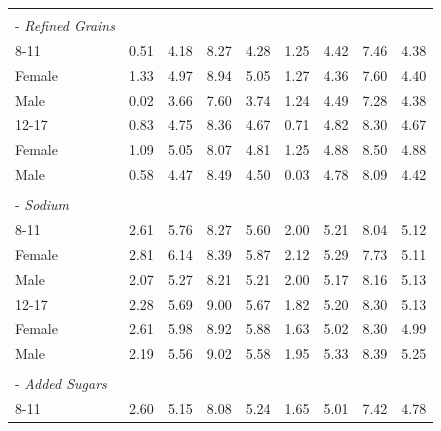 \documentclass[12pt,leqno,titlepage]{amsart}
\newcommand{\1}{\mathbbm{1}}
\begin{document}
\begin{bibunit}
\begin{longtable}{@{\extracolsep{\fill}}lcccc|cccc@{}}
\rule{0pt}{0.35em} & & & & & & & & \\
\hspace*{0.8em}- \textit{Refined Grains} & & & & & & & & \\
\hspace*{2.2em}8-11 & 0.51 & 4.18 & 8.27 & 4.28 & 1.25 & 4.42 & 7.46 & 4.38 \\
\hspace*{4.4em}Female & 1.33 & 4.97 & 8.94 & 5.05 & 1.27 & 4.36 & 7.60 & 4.40 \\
\hspace*{4.4em}Male & 0.02 & 3.66 & 7.60 & 3.74 & 1.24 & 4.49 & 7.28 & 4.38 \\
\hspace*{2.2em}12-17 & 0.83 & 4.75 & 8.36 & 4.67 & 0.71 & 4.82 & 8.30 & 4.67 \\
\hspace*{4.4em}Female & 1.09 & 5.05 & 8.07 & 4.81 & 1.25 & 4.88 & 8.50 & 4.88 \\
\hspace*{4.4em}Male & 0.58 & 4.47 & 8.49 & 4.50 & 0.03 & 4.78 & 8.09 & 4.42 \\
\rule{0pt}{1.1em} & & & & & & & & \\
\hspace*{0.8em}- \textit{Sodium} & & & & & & & & \\
\hspace*{2.2em}8-11 & 2.61 & 5.76 & 8.27 & 5.60 & 2.00 & 5.21 & 8.04 & 5.12 \\
\hspace*{4.4em}Female & 2.81 & 6.14 & 8.39 & 5.87 & 2.12 & 5.29 & 7.73 & 5.11 \\
\hspace*{4.4em}Male & 2.07 & 5.27 & 8.21 & 5.21 & 2.00 & 5.17 & 8.16 & 5.13 \\
\hspace*{2.2em}12-17 & 2.28 & 5.69 & 9.00 & 5.67 & 1.82 & 5.20 & 8.30 & 5.13 \\
\hspace*{4.4em}Female & 2.61 & 5.98 & 8.92 & 5.88 & 1.63 & 5.02 & 8.30 & 4.99 \\
\hspace*{4.4em}Male & 2.19 & 5.56 & 9.02 & 5.58 & 1.95 & 5.33 & 8.39 & 5.25 \\
\rule{0pt}{1.1em} & & & & & & & & \\
\hspace*{0.8em}- \textit{Added Sugars} & & & & & & & & \\
\hspace*{2.2em}8-11 & 2.60 & 5.15 & 8.08 & 5.24 & 1.65 & 5.01 & 7.42 & 4.78 \\

\end{longtable}
\end{bibunit}
\end{document}
